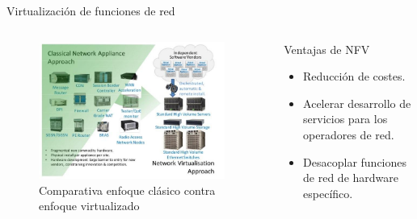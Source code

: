 \documentclass[aspectratio=169,xcolor=dvipsnames]{beamer}
\begin{document}
	\begin{frame}{Virtualización de funciones de red}
	
	\begin{columns}
	\begin{column}{0.6\textwidth}
	    \begin{figure}[h]
            \includegraphics[width=0.95\textwidth]{img/classic_network_vs_nfv.jpg}
            \caption{Comparativa enfoque clásico contra enfoque virtualizado}
       \end{figure}
	\end{column}
	
	\begin{column}{0.4\textwidth}
	\begin{alertblock}{Ventajas de NFV}
	    \begin{itemize}
	        \item Reducción de costes.
	        \item Acelerar desarrollo de servicios para los operadores de red.
	        \item Desacoplar funciones de red de hardware específico.
	    \end{itemize}
	\end{alertblock}
	\end{column}
	\end{columns}
	
	\end{frame}
	
\end{document}
